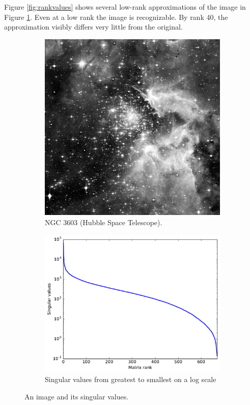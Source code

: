 Figure \ref{fig:rankvalues} shows several low-rank approximations of the image in Figure \ref{fig:hubble_original}.
Even at a low rank the image is recognizable.
By rank 40, the approximation visibly differs very little from the original.

\begin{figure}
\centering
\begin{subfigure}[b]{.49\textwidth}
\centering
\includegraphics[width=\textwidth*5/6]{hubble_red}
\caption{NGC 3603 (Hubble Space Telescope).}
\label{fig:hubble_original}
\end{subfigure}
\begin{subfigure}[b]{.49\textwidth}
\centering
\includegraphics[width=\textwidth]{hubble_svals}
\caption{Singular values from greatest to smallest on a log scale}
\label{fig:svals_plot}
\end{subfigure}
\caption{An image and its singular values.}
\label{fig:hubble}
\end{figure}

